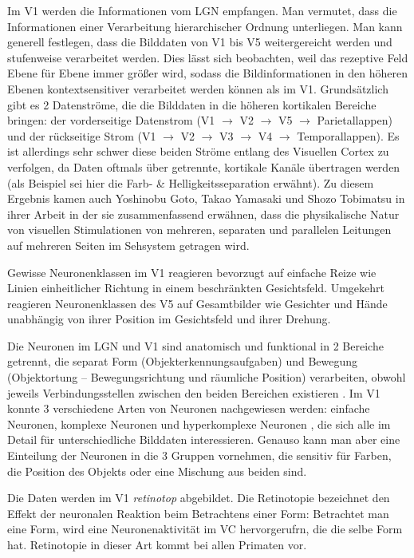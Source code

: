 \documentclass[12pt,a4paper]{article}
\newcommand{\ra}{\rightarrow}
\newcommand{\fw}[1]{\textit{#1}}
\newcommand{\Se}[1]{S. #1}
\begin{document}
Im V1 werden die Informationen vom LGN empfangen. Man vermutet, dass die
Informationen einer Verarbeitung hierarchischer Ordnung unterliegen. Man kann
generell festlegen, dass die Bilddaten von V1 bis V5 weitergereicht werden
und stufenweise verarbeitet werden. Dies lässt sich beobachten, weil das
rezeptive Feld Ebene für Ebene immer größer wird, sodass die
Bildinformationen in den höheren Ebenen kontextsensitiver verarbeitet werden
können als im V1. Grundsätzlich gibt es 2 Datenströme, die die Bilddaten in
die höheren kortikalen Bereiche bringen: der vorderseitige Datenstrom
(V1 $\ra$ V2 $\ra$ V5 $\ra$ Parietallappen) und der rückseitige Strom
(V1 $\ra$ V2 $\ra$ V3 $\ra$ V4 $\ra$ Temporallappen). Es ist allerdings sehr
schwer diese beiden Ströme entlang des Visuellen Cortex zu verfolgen, da
Daten oftmals über getrennte, kortikale Kanäle übertragen werden (als
Beispiel sei hier die Farb- \& Helligkeitsseparation erwähnt). Zu diesem
Ergebnis kamen auch Yoshinobu Goto, Takao Yamasaki und Shozo Tobimatsu in
ihrer Arbeit \cite{retinapathways} in der sie zusammenfassend erwähnen, dass
die physikalische Natur von visuellen Stimulationen von mehreren, separaten
und parallelen Leitungen auf mehreren Seiten im Sehsystem getragen wird.

Gewisse Neuronenklassen im V1 reagieren bevorzugt auf einfache Reize wie Linien
einheitlicher Richtung in einem beschränkten Gesichtsfeld. Umgekehrt reagieren
Neuronenklassen des V5 auf Gesamtbilder wie Gesichter und Hände unabhängig von
ihrer Position im Gesichtsfeld und ihrer Drehung.

Die Neuronen im LGN und V1 sind anatomisch und funktional in 2 Bereiche
getrennt, die separat Form (Objekterkennungsaufgaben) und Bewegung
(Objektortung -- Bewegungsrichtung und räumliche Position) verarbeiten,
obwohl jeweils Verbindungsstellen zwischen den beiden Bereichen existieren
\cite[\Se{2}]{arch}. Im V1 konnte 3 verschiedene Arten von Neuronen
nachgewiesen werden: einfache Neuronen, komplexe Neuronen und hyperkomplexe
Neuronen \cite{hubel}, die sich alle im Detail für unterschiedliche Bilddaten
interessieren. Genauso kann man aber eine Einteilung der Neuronen in die 3
Gruppen vornehmen, die sensitiv für Farben, die Position des Objekts oder
eine Mischung aus beiden sind.

Die Daten werden im V1 \fw{retinotop} abgebildet. Die Retinotopie bezeichnet
den Effekt der neuronalen Reaktion beim Betrachtens einer Form: Betrachtet
man eine Form, wird eine Neuronenaktivität im VC hervorgerufrn, die die
selbe Form hat. Retinotopie in dieser Art kommt bei allen Primaten vor.
\end{document}
